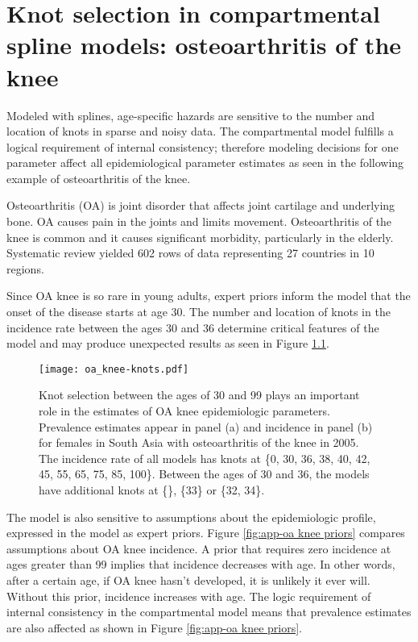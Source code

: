 \chapter{Knot selection in compartmental spline models: osteoarthritis of the knee}
\label{applications-con_fit_splines}

Modeled with splines, age-specific hazards are sensitive to the number
and location of knots in sparse and noisy data.  The compartmental
model fulfills a logical requirement of internal consistency;
therefore modeling decisions for one parameter affect all
epidemiological parameter estimates as seen in the following example
of osteoarthritis of the knee.

Osteoarthritis (OA) is joint disorder that affects joint cartilage and
underlying bone.  OA causes pain in the joints and limits movement.
Osteoarthritis of the knee is common and it causes significant
morbidity, particularly in the
elderly. \cite{felson_epidemiology_1988, felson_incidence_1995}
Systematic review yielded 602 rows of data representing 27 countries
in 10 regions.

Since OA knee is so rare in young adults, expert priors inform the
model that the onset of the disease starts at age 30.  The number and
location of knots in the incidence rate between the ages 30 and 36
determine critical features of the model and may produce unexpected
results as seen in Figure \ref{fig:app-oa knee knots}.

    \begin{figure}[h]
        \begin{center}
            \texttt{[image: oa\_knee-knots.pdf]}
            \caption{Knot selection between the ages of 30 and 99
              plays an important role in the estimates of OA knee
              epidemiologic parameters.  Prevalence estimates appear
              in panel (a) and incidence in panel (b) for females in
              South Asia with osteoarthritis of the knee in 2005.  The
              incidence rate of all models has knots at \{0, 30, 36,
              38, 40, 42, 45, 55, 65, 75, 85, 100\}.  Between the ages
              of 30 and 36, the models have additional knots at \{\}, \{33\} 
              or \{32, 34\}.}
            \label{fig:app-oa knee knots}
        \end{center}
    \end{figure}

The model is also sensitive to assumptions about the epidemiologic
profile, expressed in the model as expert priors.  Figure
\ref{fig:app-oa knee priors} compares assumptions about OA knee
incidence.  A prior that requires zero incidence at ages greater than
99 implies that incidence decreases with age.  In other words, after a
certain age, if OA knee hasn't developed, it is unlikely it ever
will. Without this prior, incidence increases with age.  The logic
requirement of internal consistency in the compartmental model means
that prevalence estimates are also affected as shown in Figure
\ref{fig:app-oa knee priors}.

